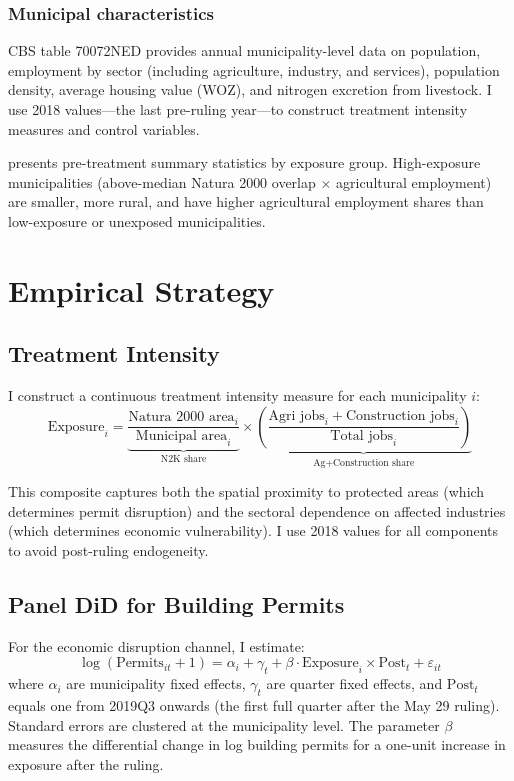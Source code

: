 \documentclass[12pt]{article}
\begin{document}
\subsubsection*{Municipal characteristics} CBS table 70072NED provides annual municipality-level data on population, employment by sector (including agriculture, industry, and services), population density, average housing value (WOZ), and nitrogen excretion from livestock. I use 2018 values---the last pre-ruling year---to construct treatment intensity measures and control variables.



 presents pre-treatment summary statistics by exposure group. High-exposure municipalities (above-median Natura 2000 overlap $\times$ agricultural employment) are smaller, more rural, and have higher agricultural employment shares than low-exposure or unexposed municipalities.

\section{Empirical Strategy}

\subsection{Treatment Intensity}

I construct a continuous treatment intensity measure for each municipality $i$:
\begin{equation}
\text{Exposure}_i = \underbrace{\frac{\text{Natura 2000 area}_i}{\text{Municipal area}_i}}_{\text{N2K share}} \times \underbrace{\left(\frac{\text{Agri jobs}_i + \text{Construction jobs}_i}{\text{Total jobs}_i}\right)}_{\text{Ag+Construction share}} \label{eq:exposure}
\end{equation}

This composite captures both the spatial proximity to protected areas (which determines permit disruption) and the sectoral dependence on affected industries (which determines economic vulnerability). I use 2018 values for all components to avoid post-ruling endogeneity.

\subsection{Panel DiD for Building Permits}

For the economic disruption channel, I estimate:
\begin{equation}
\log(\text{Permits}_{it} + 1) = \alpha_i + \gamma_t + \beta \cdot \text{Exposure}_i \times \text{Post}_t + \varepsilon_{it} \label{eq:did}
\end{equation}
where $\alpha_i$ are municipality fixed effects, $\gamma_t$ are quarter fixed effects, and $\text{Post}_t$ equals one from 2019Q3 onwards (the first full quarter after the May 29 ruling). Standard errors are clustered at the municipality level. The parameter $\beta$ measures the differential change in log building permits for a one-unit increase in exposure after the ruling.
\end{document}
